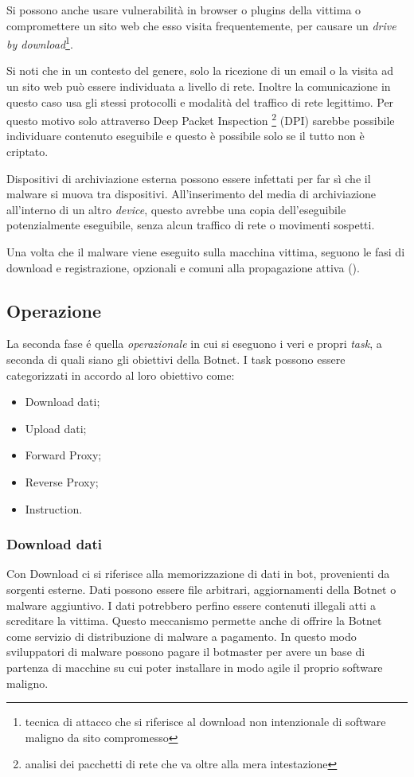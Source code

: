 Si possono anche usare vulnerabilità in browser o plugins della vittima o compromettere un sito web che esso visita frequentemente, per causare un \emph{drive by download}\footnote{tecnica di attacco che si riferisce al download non intenzionale di software maligno da sito compromesso}.

Si noti che in un contesto del genere, solo la ricezione di un email o la visita ad un sito web può essere individuata a livello di rete. Inoltre la comunicazione in questo caso usa gli stessi protocolli e modalità del traffico di rete legittimo. Per questo motivo solo attraverso Deep Packet Inspection \footnote{analisi dei pacchetti di rete che va oltre alla mera intestazione} (DPI) sarebbe possibile individuare contenuto eseguibile e questo è possibile solo se il tutto non è criptato.

Dispositivi di archiviazione esterna possono essere infettati per far sì che il malware si muova tra dispositivi. All'inserimento del media di archiviazione all'interno di un altro \textit{device}, questo avrebbe una copia dell'eseguibile potenzialmente eseguibile, senza alcun traffico di rete o movimenti sospetti.

Una volta che il malware viene eseguito sulla macchina vittima, seguono le fasi di download e registrazione, opzionali e comuni alla propagazione attiva ().


\subsection{Operazione}
 La seconda fase é quella \emph{operazionale} in cui si eseguono i veri e propri \emph{task}, a seconda di quali siano gli obiettivi della Botnet. I task possono essere categorizzati in accordo al loro obiettivo come: 
\begin{itemize}
    \centering
    \item Download  dati;
    \item Upload  dati;
    \item Forward Proxy;
    \item Reverse Proxy;
    \item Instruction.
\end{itemize}

\subsubsection{Download dati}
Con Download ci si riferisce alla memorizzazione di dati in bot, provenienti da sorgenti esterne. Dati possono essere file arbitrari, aggiornamenti della Botnet o malware aggiuntivo. I dati potrebbero perfino essere contenuti illegali atti a screditare la vittima. Questo meccanismo permette anche di offrire la Botnet come servizio di distribuzione di malware a pagamento. In questo modo sviluppatori di malware possono pagare il botmaster per avere un base di partenza di macchine su cui poter installare in modo agile il proprio software maligno.

